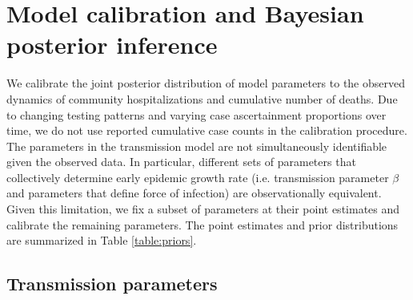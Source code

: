 \documentclass[11pt]{article}
\newcommand{\btheta}{\boldsymbol{\theta}}
\newcommand{\comments}[1]{[\textcolor{red}{#1}]}
\begin{document}


\section{Model calibration and Bayesian posterior inference}

%

We calibrate the joint posterior distribution of model parameters to the observed dynamics of community hospitalizations and cumulative number of deaths. 
Due to changing testing patterns and varying case ascertainment proportions over time, we do not use reported cumulative case counts in the calibration procedure.  
The parameters in the transmission model are not simultaneously identifiable given the observed data. In particular, different sets of parameters that collectively determine early epidemic growth rate (i.e. transmission parameter $\beta$ and parameters that define force of infection) are observationally equivalent. Given this limitation, we fix a subset of parameters at their point estimates and calibrate the remaining parameters. The point estimates and prior distributions are summarized in Table \ref{table:priors}.

\subsection{Transmission parameters} 
\end{document}
